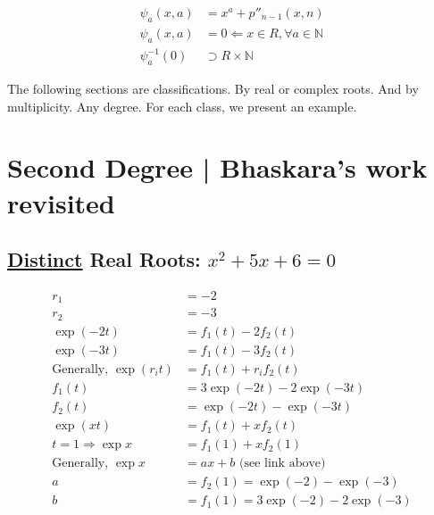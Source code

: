 \documentclass[12pt,a4paper]{article}
\begin{document}
\begin{align}
\psi_a(x, a) &= x^a + p''_{n-1}(x, n) \\
\psi_a(x, a) &= 0 \Leftarrow x \in R, \forall a \in \mathbb{N} \\
\psi_a^{-1}(0) &\supset R \times \mathbb{N}
\end{align}

The following sections are classifications. By real or complex roots. And by multiplicity. Any degree. For each class, we present an example.

\section{Second Degree | Bhaskara's work revisited}

\subsection{\href{https://www.wolframalpha.com/input/?i=e\%5Ex+\%2B+x(-e\%5E(-2)+\%2B+e\%5E(-3))+-3e\%5E(-2)+\%2B+2e\%5E(-3)+\%3D+0}{\color{blue}\underline{Distinct}} Real Roots: $x^2 + 5x + 6 = 0$}

\begin{align}
r_1 &= -2 \\
r_2 &= -3 \\
\exp (-2t) &= f_1(t) - 2 f_2(t) \\
\exp (-3t) &= f_1(t) - 3 f_2(t) \\
\text{Generally, } \exp (r_i t) &= f_1(t) + r_i f_2(t) \\
f_1(t) &= 3 \exp (-2t) - 2 \exp (-3t) \\
f_2(t) &= \exp (-2t) - \exp (-3t) \\
\exp (xt) &= f_1(t) + x f_2(t) \\
t = 1 \Rightarrow \exp x &= f_1(1) + x f_2(1) \\
\text{Generally, } \exp x &= ax + b \text{ (see link above)} \\
a &= f_2(1) = \exp (-2) - \exp (-3) \\
b &= f_1(1) = 3 \exp (-2) - 2 \exp (-3)
\end{align}
\end{document}
